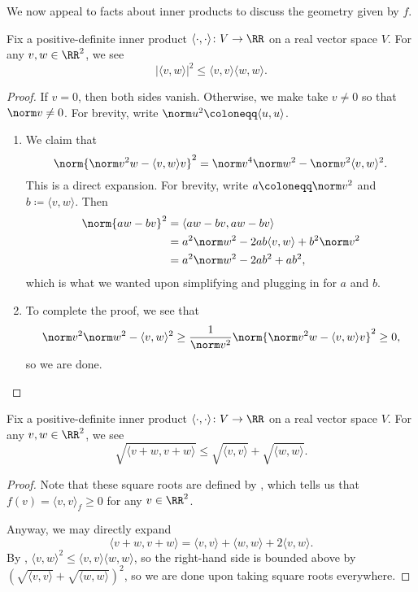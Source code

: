 \documentclass[../notes.tex]{subfiles}
\begin{document}
We now appeal to facts about inner products to discuss the geometry given by $f$.
\begin{lemma} \label{lem:cs}
	Fix a positive-definite inner product $\langle\cdot,\cdot\rangle\colon V\to\RR$ on a real vector space $V$. For any $v,w\in\RR^2$, we see
	\[\left|\langle v,w\rangle\right|^2\le\langle v,v\rangle\langle w,w\rangle.\]
\end{lemma}
\begin{proof}
	If $v=0$, then both sides vanish. Otherwise, we make take $v\ne0$ so that $\norm v\ne0$. For brevity, write $\norm u^2\coloneqq\langle u,u\rangle$.
	\begin{enumerate}
		\item We claim that
		\[\norm{\norm v^2w-\langle v,w\rangle v}^2=\norm v^4\norm w^2-\norm v^2\langle v,w\rangle^2.\]
		This is a direct expansion. For brevity, write $a\coloneqq\norm v^2$ and $b\coloneqq\langle v,w\rangle$. Then
		\begin{align*}
			\norm{aw-bv}^2 &= \langle aw-bv,aw-bv\rangle \\
			&= a^2\norm w^2-2ab\langle v,w\rangle+b^2\norm v^2 \\
			&= a^2\norm w^2-2ab^2+ab^2,
		\end{align*}
		which is what we wanted upon simplifying and plugging in for $a$ and $b$.
		\item To complete the proof, we see that
		\[\norm v^2\norm w^2-\langle v,w\rangle^2\ge\frac1{\norm v^2}\norm{\norm v^2w-\langle v,w\rangle v}^2\ge0,\]
		so we are done.
		\qedhere
	\end{enumerate}
\end{proof}
\begin{proposition} \label{prop:triangle-ineq}
	Fix a positive-definite inner product $\langle\cdot,\cdot\rangle\colon V\to\RR$ on a real vector space $V$. For any $v,w\in\RR^2$, we see
	\[\sqrt{\langle v+w,v+w\rangle}\le\sqrt{\langle v,v\rangle}+\sqrt{\langle w,w\rangle}.\]
\end{proposition}
\begin{proof}
	Note that these square roots are defined by , which tells us that $f(v)=\langle v,v\rangle_f\ge0$ for any $v\in\RR^2$.

	Anyway, we may directly expand
	\[\langle v+w,v+w\rangle=\langle v,v\rangle+\langle w,w\rangle+2\langle v,w\rangle.\]
	By , $\langle v,w\rangle^2\le\langle v,v\rangle\langle w,w\rangle$, so the right-hand side is bounded above by $\left(\sqrt{\langle v,v\rangle}+\sqrt{\langle w,w\rangle}\right)^2$, so we are done upon taking square roots everywhere.
\end{proof}
\end{document}
